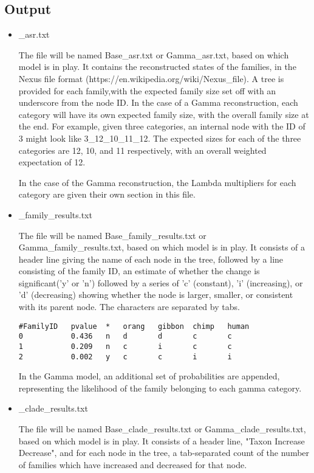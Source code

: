 \documentclass{article}
\begin{document}
\subsection{Output}
\begin{itemize}
\item{\_asr.txt}

The file will be named Base\_asr.txt or Gamma\_asr.txt, based on which model is in play. It contains the reconstructed states of the families, in the Nexus file format (https://en.wikipedia.org/wiki/Nexus\_file). A tree is provided for each
family,with the expected family size set off with an underscore from the node ID. 
In the case of a Gamma reconstruction, each category will have its own expected family size, with the overall family size at the end. For example, given three categories, an internal node with the ID of 3 might look like 3\_12\_10\_11\_12. The expected sizes for each of the three categories are 12, 10, and 11 respectively, with an overall weighted expectation of 12. 

In the case of the Gamma reconstruction, the Lambda multipliers for each category are given their own section in this file.

\item{\_family\_results.txt}

The file will be named Base\_family\_results.txt or Gamma\_family\_results.txt, based on which model is in play. It consists of a header line giving the name of each node in the tree, followed by a line consisting of the family ID, an estimate of whether the change is significant('y' or 'n') followed by a series of 'c' (constant), 'i' (increasing), or 'd' (decreasing) showing whether the node is larger, smaller, or consistent with its parent node. The characters are separated by tabs.

\begin{lstlisting}
#FamilyID   pvalue  *   orang   gibbon  chimp   human     
0           0.436   n   d       d       c       c 
1           0.209   n   c       i       c       c
2           0.002   y   c       c       i       i
\end{lstlisting}

In the Gamma model, an additional set of probabilities are appended, representing the likelihood of the family belonging to each gamma category.

\item{\_clade\_results.txt}

The file will be named Base\_clade\_results.txt or Gamma\_clade\_results.txt, based on which model is in play. It consists of a header line, "Taxon Increase Decrease", and for each node in the tree, a tab-separated count of the number of families which have increased and decreased for that node.


\end{itemize}
\end{document}
